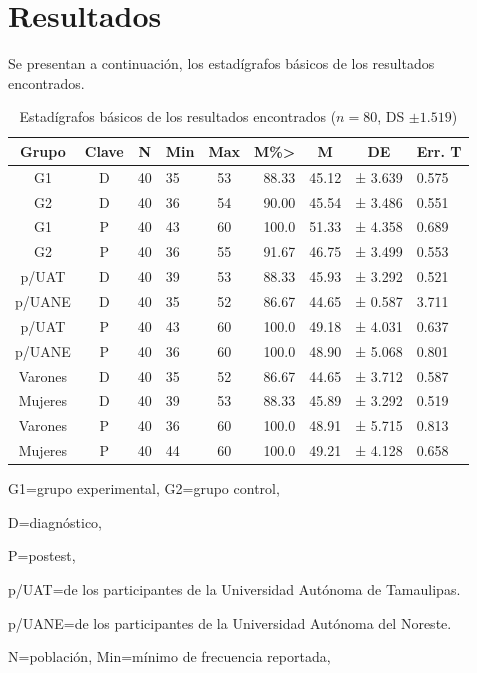 \documentclass[spanish]{textolivre}
\begin{document}
\section{Resultados}

Se presentan a continuación, los estadígrafos básicos de los resultados encontrados.

\begin{table}[h!]
\centering
\begin{threeparttable}
\caption{Estadígrafos básicos de los resultados encontrados ($n=80$, DS $\pm 1.519$)}
\label{tab1}
\begin{tabular}{ccclcrccl}
Grupo & Clave  & N  & Min & Max & M\%\textgreater{} & M  & DE   & Err. T \\
\midrule
G1 & D & 40 & 35 & 53 & 88.33 & 45.12 & ± 3.639 & 0.575  \\
G2 & D & 40 & 36  & 54  & 90.00 & 45.54 & ± 3.486 & 0.551  \\
G1 & P & 40 & 43 & 60 & 100.0 & 51.33 & ± 4.358   & 0.689  \\
G2 & P & 40 & 36 & 55 & 91.67 & 46.75 & ± 3.499   & 0.553  \\
p/UAT & D & 40 & 39  & 53  & 88.33 & 45.93 & ± 3.292 & 0.521  \\
p/UANE & D & 40 & 35 & 52 & 86.67 & 44.65 & ± 0.587 & 3.711 \\
p/UAT & P & 40 & 43 & 60 & 100.0 & 49.18   & ± 4.031 & 0.637  \\
p/UANE & P & 40 & 36 & 60 & 100.0 & 48.90 & ± 5.068 & 0.801  \\
Varones & D & 40 & 35 & 52 & 86.67 & 44.65 & ± 3.712 & 0.587  \\
Mujeres & D & 40 & 39 & 53 & 88.33 & 45.89 & ± 3.292 & 0.519  \\
Varones & P & 40 & 36 & 60 & 100.0 & 48.91 & ± 5.715 & 0.813  \\
Mujeres & P & 40 & 44 & 60 & 100.0 & 49.21 & ± 4.128 & 0.658 \\
\bottomrule
\end{tabular}
\begin{tablenotes}
\small{
\item G1=grupo experimental, G2=grupo control,
\item D=diagnóstico, 
\item P=postest, 
\item p/UAT=de los participantes de la Universidad Autónoma de Tamaulipas. 
\item p/UANE=de los participantes de la Universidad Autónoma del Noreste. 
\item N=población, Min=mínimo de frecuencia reportada, 
}
\end{tablenotes}
\end{threeparttable}
\end{table}
\end{document}

